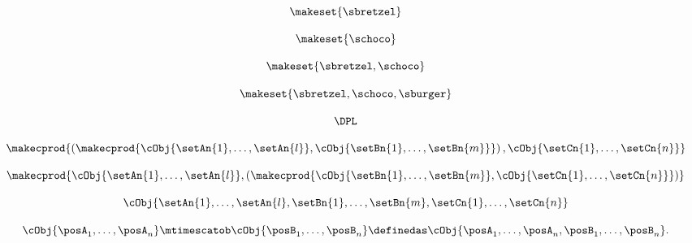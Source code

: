 \begin{forslides}
    \begin{equation}
        \label{eq:parallelism-156}
        \makeset{ \sbretzel }
    \end{equation}

    \begin{equation}
        \label{eq:parallelism-157}
        \makeset{ \schoco }
    \end{equation}

    \begin{equation}
        \label{eq:parallelism-158}
        \makeset{ \sbretzel, \schoco }
    \end{equation}

    \begin{equation}
        \label{eq:parallelism-159}
        \makeset{ \sbretzel, \schoco, \sburger }
    \end{equation}

    \begin{equation}
        \label{eq:parallelism-160}
        \DPL
    \end{equation}

    \begin{equation}
    \label{eq:parallelism-161}
    \makecprod{
        \left ( \makecprod{\cObj{\setAn{1}, \ldots, \setAn{l}}, \cObj{\setBn{1}, \ldots, \setBn{m}}} \right )
        ,
        \cObj{\setCn{1}, \ldots, \setCn{n}}
    }
\end{equation}

    \begin{equation}
        \label{eq:parallelism-162}
            \makecprod{
        \cObj{\setAn{1}, \ldots, \setAn{l}},
        \left (
        \makecprod{
            \cObj{\setBn{1}, \ldots, \setBn{m}},
            \cObj{\setCn{1}, \ldots, \setCn{n}}
        }
        \right )
    }
    \end{equation}

    \begin{equation}
        \label{eq:parallelism-163}
            \cObj{\setAn{1}, \ldots, \setAn{l}, \setBn{1}, \ldots, \setBn{m}, \setCn{1}, \ldots, \setCn{n}}
    \end{equation}

    \begin{equation}
        \label{eq:parallelism-164}
         \cObj{\posA_1,\ldots, \posA_n} \mtimescatob \cObj{\posB_1,\ldots, \posB_n}  \definedas
        \cObj{\posA_1,\ldots, \posA_n, \posB_1,\ldots, \posB_n}.
    \end{equation}


\end{forslides}
